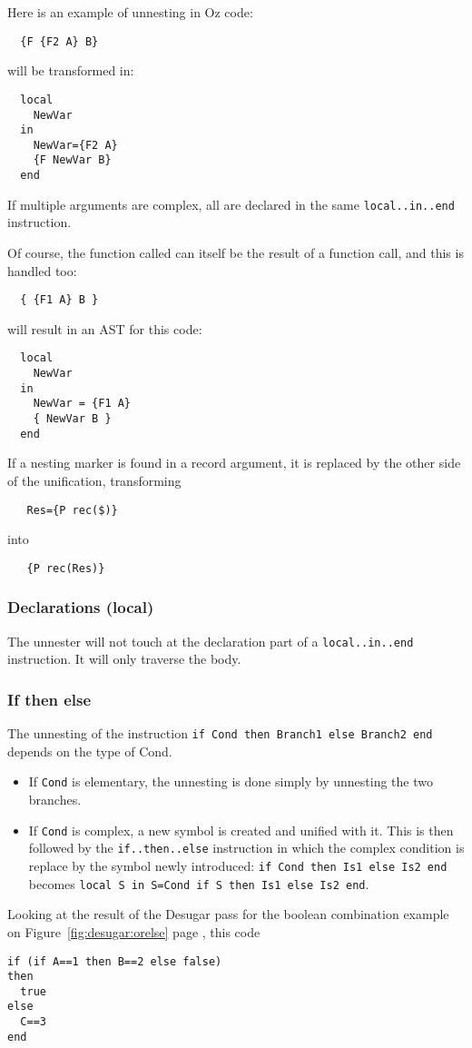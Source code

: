 \documentclass[a4paper]{memoir}
\begin{document}
Here is an example of unnesting in Oz code:
\begin{lstlisting}
  {F {F2 A} B}
\end{lstlisting}
will be transformed in:
\begin{lstlisting}
  local
    NewVar
  in
    NewVar={F2 A}
    {F NewVar B}
  end
\end{lstlisting}

If multiple arguments are complex, all are declared in the same
\lstinline!local..in..end! instruction.

Of course, the function called can itself be the result of a function call, and this is handled too:
\begin{lstlisting}
  { {F1 A} B }
\end{lstlisting}
will result in an AST for this code:
\begin{lstlisting}
  local
    NewVar
  in
    NewVar = {F1 A}
    { NewVar B }
  end
\end{lstlisting}

If a nesting marker is found in a record argument, it is replaced by the other
side of the unification, transforming
\begin{lstlisting}
   Res={P rec($)}
\end{lstlisting}
into
\begin{lstlisting}
   {P rec(Res)}
\end{lstlisting}

\subsubsection{Declarations (local)}
The unnester will not touch at the declaration part of a
\lstinline!local..in..end! instruction. It will only traverse the body.
\subsubsection{If then else}
The unnesting of the instruction \lstinline!if Cond then Branch1 else Branch2 end! depends on the type of Cond. 
\begin{itemize}
  \item If \lstinline!Cond! is elementary, the unnesting is done simply by unnesting the two branches.
  \item If \lstinline!Cond! is complex, a new symbol is created and unified with it. This is then followed by the \lstinline!if..then..else! instruction in which the complex condition is replace by the symbol newly introduced:
    \lstinline!if Cond then Is1 else Is2 end! becomes \lstinline!local S in S=Cond if S then Is1 else Is2 end!.
\end{itemize}
Looking at the result of the Desugar pass for the boolean combination example on
Figure~\ref{fig:desugar:orelse} page \pageref{fig:desugar:orelse}, this code
\begin{lstlisting}
if (if A==1 then B==2 else false)
then
  true
else
  C==3
end
\end{lstlisting}
\end{document}
